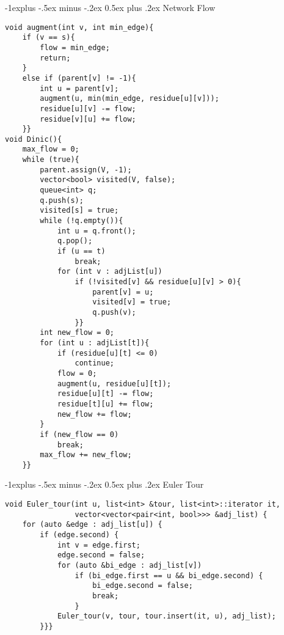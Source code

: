 \documentclass[10pt,landscape]{article}
\makeatletter
\renewcommand{\subsection}{\@startsection{subsection}{2}{0mm}%
                                {-1explus -.5ex minus -.2ex}%
                                {0.5ex plus .2ex}%
                                {\normalfont\normalsize\bfseries}}
\makeatother
\begin{document}
\begin{multicols}{2}
\subsection{Network Flow}
\begin{lstlisting}
void augment(int v, int min_edge){
    if (v == s){
        flow = min_edge;
        return;
    }
    else if (parent[v] != -1){
        int u = parent[v];
        augment(u, min(min_edge, residue[u][v]));
        residue[u][v] -= flow;
        residue[v][u] += flow;
    }}
void Dinic(){
    max_flow = 0;
    while (true){
        parent.assign(V, -1);
        vector<bool> visited(V, false);
        queue<int> q;
        q.push(s);
        visited[s] = true;
        while (!q.empty()){
            int u = q.front();
            q.pop();
            if (u == t)
                break;
            for (int v : adjList[u])
                if (!visited[v] && residue[u][v] > 0){
                    parent[v] = u;
                    visited[v] = true;
                    q.push(v);
                }}
        int new_flow = 0;
        for (int u : adjList[t]){
            if (residue[u][t] <= 0)
                continue;
            flow = 0;
            augment(u, residue[u][t]);
            residue[u][t] -= flow;
            residue[t][u] += flow;
            new_flow += flow;
        }
        if (new_flow == 0)
            break;
        max_flow += new_flow; 
    }}
\end{lstlisting}

\subsection{Euler Tour}
\begin{lstlisting}
void Euler_tour(int u, list<int> &tour, list<int>::iterator it, 
                vector<vector<pair<int, bool>>> &adj_list) {
    for (auto &edge : adj_list[u]) {
        if (edge.second) {
            int v = edge.first;
            edge.second = false;
            for (auto &bi_edge : adj_list[v]) 
                if (bi_edge.first == u && bi_edge.second) {
                    bi_edge.second = false;
                    break;
                }
            Euler_tour(v, tour, tour.insert(it, u), adj_list);
        }}}
\end{lstlisting}


\end{multicols}
\end{document}
